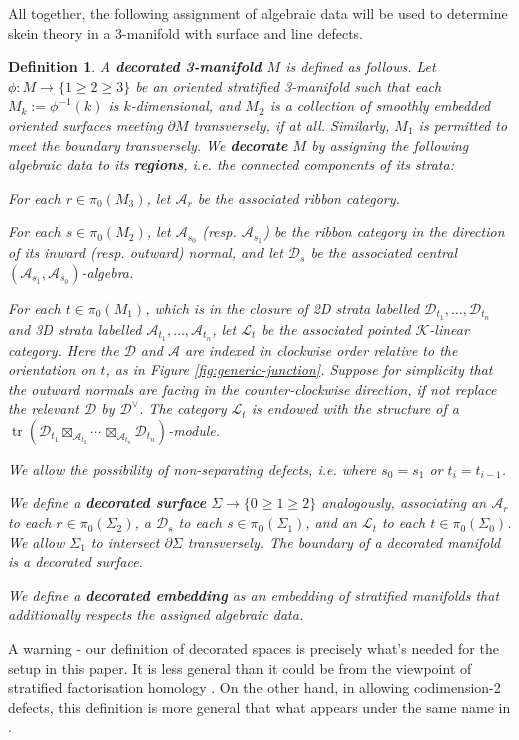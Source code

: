 \documentclass[a4paper]{article}
\numberwithin{equation}{section}
\newtheorem{definition}[counter]{Definition}
\newcommand{\1}{{\mathrm{1}\mkern-4mu{\mathchoice{}{}{\mskip-0.5mu}{\mskip-1mu}}\mathrm{l}}}
\newcommand{\A}{\mathcal{A}}
\newcommand{\D}{\mathcal{D}}
\newcommand{\K}{\mathcal{K}}
\renewcommand{\L}{\mathcal{L}}
\DeclareMathOperator{\tr}{tr}
\begin{document}
All together, the following assignment of algebraic data will be used to determine skein theory in a 3-manifold with surface and line defects.

\begin{definition}\label{def:decorated-manifold}
  A \emph{\bf decorated 3-manifold} $M$ is defined as follows. Let $\phi : M \to \{1 \geq 2 \geq 3\}$ be an oriented stratified 3-manifold such that each $M_k := \phi^{-1}(k)$ is $k$-dimensional, and $M_2$ is a collection of smoothly embedded oriented surfaces meeting $\partial M$ transversely, if at all. Similarly, $M_1$ is permitted to meet the boundary transversely.
  We \emph{\bf decorate} $M$ by assigning the following algebraic data to its \emph{\bf regions}, i.e. the connected components of its strata:
  \begin{list}{\textbullet}{}
    \item For each $r \in \pi_0(M_3)$, let $\A_r$ be the associated ribbon category.
    \item For each $s \in \pi_0(M_2)$, let $\A_{s_0}$ (resp. $\A_{s_1}$) be the ribbon category in the direction of its inward (resp. outward) normal, and let $\D_s$ be the associated central $(\A_{s_1},\A_{s_0})$-algebra.

    \item For each $t \in \pi_0(M_1)$, which is in the closure of 2D strata labelled $\D_{t_1},\ldots,\D_{t_n}$ and 3D strata labelled $\A_{t_1},\ldots, \A_{t_n}$, let $\L_t$ be the associated pointed $\K$-linear category. Here the $\D$ and $\A$ are indexed in clockwise order relative to the orientation on $t$, as in Figure \ref{fig:generic-junction}. Suppose for simplicity that the outward normals are facing in the counter-clockwise direction, if not replace the relevant $\D$ by $\D^\vee$.  
      The category $\L_t$ is endowed with the structure of a $\tr(\D_{t_1}\boxtimes_{\A_{t_2}} \cdots \,\boxtimes_{\A_{t_{n}}} \D_{t_n})$-module.
  \end{list}
  We allow the possibility of non-separating defects, i.e. where $s_0 = s_1$ or $t_{i} = t_{i-1}$. 

  We define a \emph{\bf decorated surface} $\Sigma\to \{0\geq 1 \geq 2\}$ analogously, associating an $\A_r$ to each $r \in \pi_0(\Sigma_2)$, a $\D_s$ to each $s \in \pi_0(\Sigma_1)$, and an $\L_t$ to each $t \in \pi_0(\Sigma_0)$. We allow $\Sigma_1$ to intersect $\partial \Sigma$ transversely.
  The boundary of a decorated manifold is a decorated surface.

  We define a \emph{\bf decorated embedding} as an embedding of stratified manifolds that additionally respects the assigned algebraic data.
\end{definition}
A warning - our definition of decorated spaces is precisely what's needed for the setup in this paper. It is less general than it could be from the viewpoint of stratified factorisation homology \cite{AFT2017,AFT2017local}.
On the other hand, in allowing codimension-2 defects, this definition is more general that what appears under the same name in \cite{Brown_Jordan_2025,JLSS2021}. 
\end{document}

